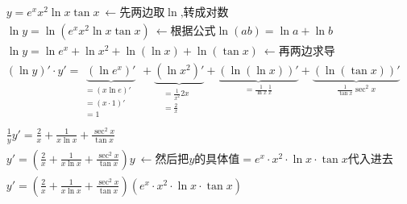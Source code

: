 \documentclass[UTF8]{ctexart}
\begin{document}
\begin{myEnvSample}
	\begin{align*}
		&y=e^xx^2\ln x\tan x\ \gets \text{先两边取}\ln\text{,转成对数}\\
	&\ln y=\ln \left( e^xx^2\ln x\tan x \right) \ \gets \text{根据公式}\ln \left( ab \right) =\ln a+\ln b\\
	&\ln y=\ln e^x+\ln x^2+\ln \left( \ln x \right) +\ln \left( \tan x \right) \ \gets \text{再两边求导}\\
	&\left( \ln y \right) '\cdot y'=\underset{\begin{matrix}
			=\left( x\ln e \right) '\\
			=\left( x\cdot 1 \right) '\\
			=1\\
	&\end{matrix}}{\underbrace{\left( \ln e^x \right) '}}+\underset{\begin{matrix}
			=\frac{1}{x^2}2x\\
			=\frac{2}{x}\\
	&\end{matrix}}{\underbrace{\left( \ln x^2 \right) '}}+\underset{=\frac{1}{\ln x}\frac{1}{x}}{\underbrace{\left( \ln \left( \ln x \right) \right) '}}+\underset{\frac{1}{\tan x}\sec ^2x}{\underbrace{\left( \ln \left( \tan x \right) \right) '}}\\
	&\frac{1}{y}y'=\frac{2}{x}+\frac{1}{x\ln x}+\frac{\sec ^2x}{\tan x}\\
	&y'=\left( \frac{2}{x}+\frac{1}{x\ln x}+\frac{\sec ^2x}{\tan x} \right) y\ \gets \text{然后把}y\text{的具体值}=e^x\cdot x^2\cdot \ln x\cdot \tan x\text{代入进去}\\
	&y'=\left( \frac{2}{x}+\frac{1}{x\ln x}+\frac{\sec ^2x}{\tan x} \right) \left( e^x\cdot x^2\cdot \ln x\cdot \tan x \right)	
	\end{align*}
\end{myEnvSample}
\end{document}
